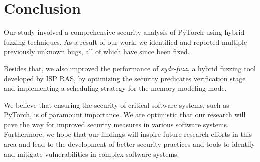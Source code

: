 \section{Conclusion}

Our study involved a comprehensive security analysis of PyTorch using hybrid fuzzing techniques. As a result of our work, we identified and reported multiple previously unknown bugs, all of which have since been fixed.

Besides that, we also improved the performance of \textit{sydr-fuzz}, a hybrid fuzzing tool developed by ISP RAS, by optimizing the security predicates verification stage and implementing a scheduling strategy for the memory modeling mode.

We believe that ensuring the security of critical software systems, such as PyTorch, is of paramount importance. We are optimistic that our research will pave the way for improved security measures in various software systems. Furthermore, we hope that our findings will inspire future research efforts in this area and lead to the development of better security practices and tools to identify and mitigate vulnerabilities in complex software systems.
